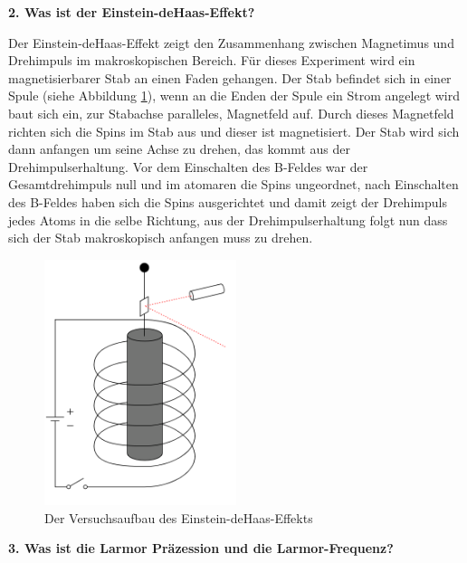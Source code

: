 \noindent\textbf{2. Was ist der Einstein-deHaas-Effekt?}\\
\begin{addmargin}[25pt]{0pt}
Der Einstein-deHaas-Effekt zeigt den Zusammenhang zwischen Magnetimus und Drehimpuls im makroskopischen Bereich. Für dieses Experiment wird ein magnetisierbarer Stab an einen Faden gehangen. Der Stab befindet sich in einer Spule (siehe Abbildung \ref{fig:Einstein_deHaas}), wenn an die Enden der Spule ein Strom angelegt wird baut sich ein, zur Stabachse paralleles, Magnetfeld auf. Durch dieses Magnetfeld richten sich die Spins im Stab aus und dieser ist magnetisiert. Der Stab wird sich dann anfangen um seine Achse zu drehen, das kommt aus der Drehimpulserhaltung. Vor dem Einschalten des B-Feldes war der Gesamtdrehimpuls null und im atomaren die Spins ungeordnet, nach Einschalten des B-Feldes haben sich die Spins ausgerichtet und damit zeigt der Drehimpuls jedes Atoms in die selbe Richtung, aus der Drehimpulserhaltung folgt nun dass sich der Stab makroskopisch anfangen muss zu drehen.\\
\begin{figure}[h]
    \centering
    \includegraphics[width = 0.5\textwidth]{images/KM2/Einstein_deHaas.png}
    \caption{Der Versuchsaufbau des Einstein-deHaas-Effekts}
    \label{fig:Einstein_deHaas}
\end{figure}
\end{addmargin}
\vspace{5cm}
\noindent\textbf{3. Was ist die Larmor Präzession und die Larmor-Frequenz?}\\
